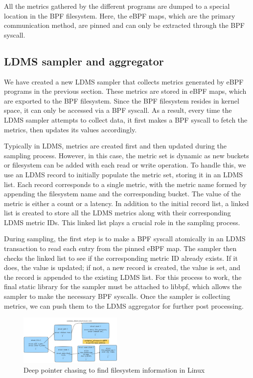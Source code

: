 \documentclass[sigconf]{acmart}
\begin{document}
All the metrics gathered by the different programs are dumped to a special location in the BPF filesystem. Here, the eBPF maps, which are the primary communication method, are pinned and can only be extracted through the BPF syscall.
\subsection{LDMS sampler and aggregator} 
We have created a new LDMS sampler \cite{ldms_github} that collects metrics generated by eBPF programs in the previous section. These metrics are stored in eBPF maps, which are exported to the BPF filesystem. Since the BPF filesystem resides in kernel space, it can only be accessed via a BPF syscall. As a result, every time the LDMS sampler attempts to collect data, it first makes a BPF syscall to fetch the metrics, then updates its values accordingly.

Typically in LDMS, metrics are created first and then updated during the sampling process. However, in this case, the metric set is dynamic as new buckets or filesystem can be added with each read or write operation. To handle this, we use an LDMS record to initially populate the metric set, storing it in an LDMS list. Each record corresponds to a single metric, with the metric name formed by appending the filesystem name and the corresponding bucket. The value of the metric is either a count or a latency. In addition to the initial record list, a linked list is created to store all the LDMS metrics along with their corresponding LDMS metric IDs. This linked list plays a crucial role in the sampling process. 

During sampling, the first step is to make a BPF syscall atomically in an LDMS transaction to read each entry from the pinned eBPF map. The sampler then checks the linked list to see if the corresponding metric ID already exists. If it does, the value is updated; if not, a new record is created, the value is set, and the record is appended to the existing LDMS list. For this process to work, the final static library for the sampler must be attached to libbpf, which allows the sampler to make the necessary BPF syscalls. Once the sampler is collecting metrics, we can push them to the LDMS aggregator for further post processing.
\begin{figure}
    \centering
    \includegraphics[width=0.45\textwidth]{images/pointer.png}
    \caption{Deep pointer chasing to find filesystem information in Linux}
    \label{fig:pointer}
\end{figure}
\end{document}
